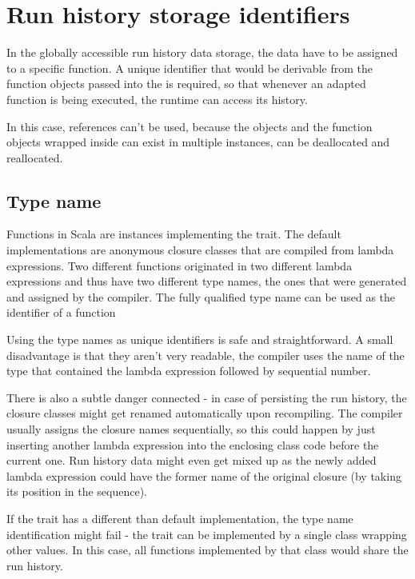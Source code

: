 \section{Run history storage identifiers}

In the globally accessible run history data storage, the data have to be assigned to a specific function. A unique identifier that would be derivable from the function objects passed into the  is required, so that whenever an adapted function is being executed, the runtime can access its history. 

In this case, references can't be used, because the  objects and the function objects wrapped inside can exist in multiple instances, can be deallocated and reallocated.

\subsection{Type name}

Functions in Scala are instances implementing the  trait. The default implementations are anonymous closure classes that are compiled from lambda expressions. Two different functions originated in two different lambda expressions and thus have two different type names, the ones that were generated and assigned by the compiler. The fully qualified type name can be used as the identifier of a function

Using the type names as unique identifiers is safe and straightforward. A small disadvantage is that they aren't very readable, the compiler uses the name of the type that contained the lambda expression followed by sequential number. 

There is also a subtle danger connected - in case of persisting the run history, the closure classes might get renamed automatically upon recompiling. The compiler usually assigns the closure names sequentially, so this could happen by just inserting another lambda expression into the enclosing class code before the current one. Run history data might even get mixed up as the newly added lambda expression could have the former name of the original closure (by taking its position in the sequence).

If the  trait has a different than default implementation, the type name identification might fail - the trait can be implemented by a single class wrapping other values. In this case, all functions implemented by that class would share the run history.

